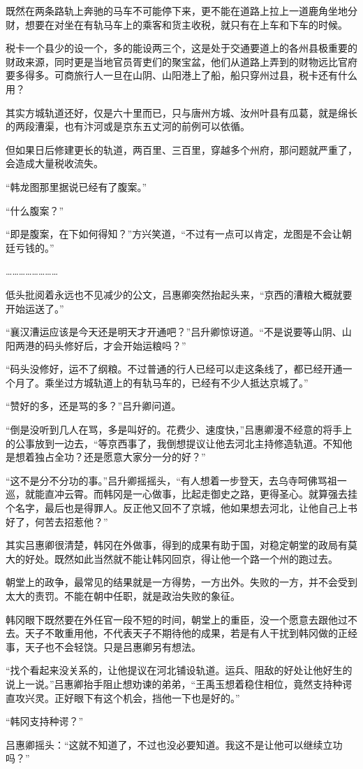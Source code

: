 既然在两条路轨上奔驰的马车不可能停下来，更不能在道路上拉上一道鹿角坐地分财，想要在对坐在有轨马车上的乘客和货主收税，就只有在上车和下车的时候。

税卡一个县少的设一个，多的能设两三个，这是处于交通要道上的各州县极重要的财政来源，同时更是当地官员胥吏们的聚宝盆，他们从道路上弄到的财物远比官府要多得多。可商旅行人一旦在山阴、山阳港上了船，船只穿州过县，税卡还有什么用？

其实方城轨道还好，仅是六十里而已，只与唐州方城、汝州叶县有瓜葛，就是绵长的两段漕渠，也有汴河或是京东五丈河的前例可以依循。

但如果日后修建更长的轨道，两百里、三百里，穿越多个州府，那问题就严重了，会造成大量税收流失。

“韩龙图那里据说已经有了腹案。”

“什么腹案？”

“即是腹案，在下如何得知？”方兴笑道，“不过有一点可以肯定，龙图是不会让朝廷亏钱的。”

……………………

低头批阅着永远也不见减少的公文，吕惠卿突然抬起头来，“京西的漕粮大概就要开始运送了。”

“襄汉漕运应该是今天还是明天才开通吧？”吕升卿惊讶道。“不是说要等山阴、山阳两港的码头修好后，才会开始运粮吗？”

“码头没修好，运不了纲粮。不过普通的行人已经可以走这条线了，都已经开通一个月了。乘坐过方城轨道上的有轨马车的，已经有不少人抵达京城了。”

“赞好的多，还是骂的多？”吕升卿问道。

“倒是没听到几人在骂，多是叫好的。花费少、速度快，”吕惠卿漫不经意的将手上的公事放到一边去，“等京西事了，我倒想提议让他去河北主持修造轨道。不知他是想着独占全功？还是愿意大家分一分的好？”

“这不是分不分功的事。”吕升卿摇摇头，“有人想着一步登天，去乌寺呵佛骂祖一巡，就能直冲云霄。而韩冈是一心做事，比起走御史之路，更得圣心。就算强去挂个名字，最后也是得罪人。反正他又回不了京城，他如果想去河北，让他自己上书好了，何苦去招惹他？”

其实吕惠卿很清楚，韩冈在外做事，得到的成果有助于国，对稳定朝堂的政局有莫大的好处。既然如此当然就不能让韩冈回京，得让他一个路一个州的跑过去。

朝堂上的政争，最常见的结果就是一方得势，一方出外。失败的一方，并不会受到太大的责罚。不能在朝中任职，就是政治失败的象征。

韩冈眼下既然要在外任官一段不短的时间，朝堂上的重臣，没一个愿意去跟他过不去。天子不敢重用他，不代表天子不期待他的成果，若是有人干扰到韩冈做的正经事，天子也不会轻饶。只是吕惠卿另有想法。

“找个看起来没关系的，让他提议在河北铺设轨道。运兵、阻敌的好处让他好生的说上一说。”吕惠卿抬手阻止想劝谏的弟弟，“王禹玉想着稳住相位，竟然支持种谔直攻兴灵。正好眼下有这个机会，挡他一下也是好的。”

“韩冈支持种谔？”

吕惠卿摇头：“这就不知道了，不过也没必要知道。我这不是让他可以继续立功吗？”

